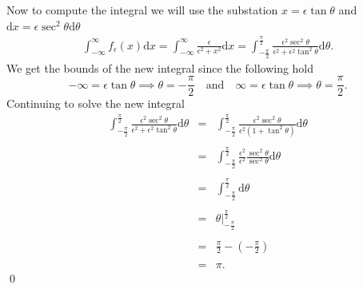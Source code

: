 \documentclass[10pt]{amsart}
\newcommand{\D}{\mathrm{d}}
\theoremstyle{nonumberplain}
\begin{document}
\begin{enumerate}[label={\bf {\arabic*}:}]
\noindent
Now to compute the integral we will use the substation $x = \epsilon \tan \theta$ and $\D x = \epsilon \sec^2 \theta \D \theta$
\begin{eqnarray*}
\int_{-\infty}^\infty f_\epsilon(x) \D x = \int_{-\infty}^\infty \frac{\epsilon} {\epsilon^2+x^2} \D x = \int_{-\frac{\pi}{2}}^{\frac{\pi}{2}} \frac{\epsilon^2 \sec^2 \theta} {\epsilon^2 + \epsilon^2 \tan^2\theta}  \D \theta.
\end{eqnarray*}
We get the bounds of the new integral since the following hold $$-\infty = \epsilon \tan \theta \implies \theta = -\frac{\pi}{2} \quad \text{and} \quad \infty = \epsilon \tan \theta \implies \theta = \frac{\pi}{2}.$$
Continuing to solve the new integral
\begin{eqnarray*}
\int_{-\frac{\pi}{2}}^{\frac{\pi}{2}} \frac{\epsilon^2 \sec^2 \theta} {\epsilon^2 + \epsilon^2 \tan^2\theta}  \D \theta &=& \int_{-\frac{\pi}{2}}^{\frac{\pi}{2}} \frac{\epsilon^2 \sec^2 \theta} {\epsilon^2 \left(1 + \tan^2\theta\right)}  \D \theta \\ \\
&=& \int_{-\frac{\pi}{2}}^{\frac{\pi}{2}} \frac{\epsilon^2 }{\epsilon^2 }\frac{\sec^2 \theta} {\sec^2 \theta}  \D \theta \\ \\
&=& \int_{-\frac{\pi}{2}}^{\frac{\pi}{2}} \D \theta \\ \\
&=& \left. \theta \right|_{-\frac{\pi}{2}}^{\frac{\pi}{2}} \\ \\
&=& \frac{\pi}{2} - \left(-\frac{\pi}{2}\right) \\ \\
&=& \pi.
\end{eqnarray*}
\qed \\


\end{enumerate}
\end{document}
